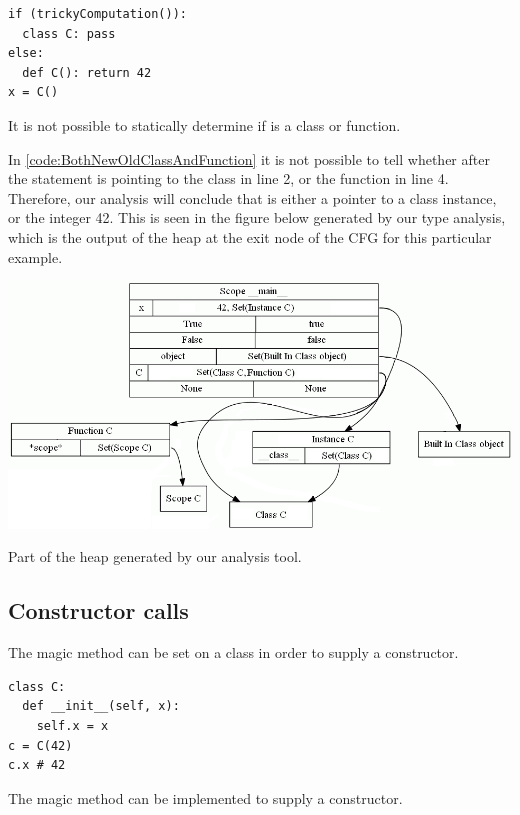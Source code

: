 \begin{listing}[H]
	\begin{verbatim}
if (trickyComputation()):
  class C: pass
else:
  def C(): return 42
x = C()
	\end{verbatim}
	\caption{It is not possible to statically determine if  is a class or function.}
	\label{code:BothNewOldClassAndFunction}
\end{listing}

In \autoref{code:BothNewOldClassAndFunction} it is not possible to tell whether  after the  statement is pointing to the class in line 2, or the function in line 4. Therefore, our analysis will conclude that  is either a pointer to a class instance, or the integer 42. This is seen in the figure below generated by our type analysis, which is the output of the heap at the exit node of the CFG for this particular example.

\begin{listing}[H]
	\begin{center}
		\includegraphics[width=1\textwidth]{images/BothNewOldClassAndFunction.png}
	\end{center}
	\vspace{-10pt}
	\caption{Part of the heap generated by our analysis tool.}
	\label{fig:BothNewOldClassAndFunction}
\end{listing}


\newpage

\subsection{Constructor calls}
\label{section:Constructor calls}
The magic method  can be set on a class in order to supply a constructor.

\begin{listing}[H]
	\begin{verbatim}
class C:
  def __init__(self, x):
    self.x = x
c = C(42)
c.x # 42
	\end{verbatim}
	\caption{The magic method  can be implemented to supply a constructor.}
	\label{code:InitConstructorClass}
\end{listing}

